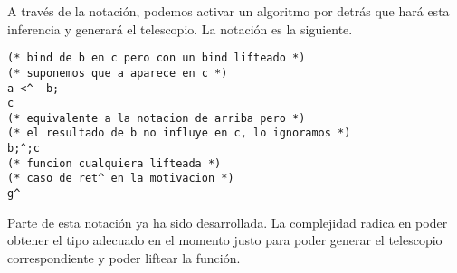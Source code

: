 A través de la notación, podemos activar un algoritmo por detrás que hará esta inferencia y generará el telescopio.
La notación es la siguiente.

\begin{lstlisting}
(* bind de b en c pero con un bind lifteado *)
(* suponemos que a aparece en c *)
a <^- b;
c 
(* equivalente a la notacion de arriba pero *)
(* el resultado de b no influye en c, lo ignoramos *)
b;^;c
(* funcion cualquiera lifteada *)
(* caso de ret^ en la motivacion *)
g^ 
\end{lstlisting}

Parte de esta notación ya ha sido desarrollada. La complejidad radica en poder obtener el tipo adecuado en el momento justo para poder generar el telescopio correspondiente y poder liftear la función.